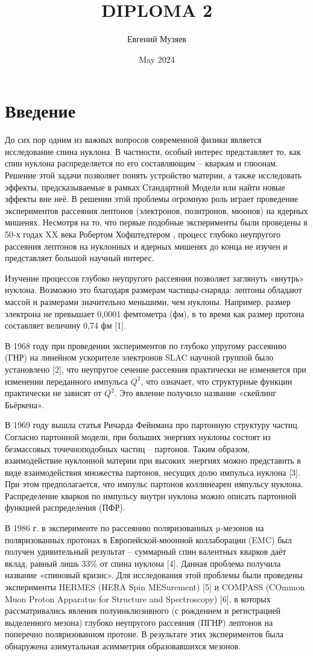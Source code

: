 \documentclass{extarticle}
\title{DIPLOMA 2}
\author{Евгений Музяев}
\date{May 2024}
\begin{document}



\newpage
\setcounter{page}{2}
\tableofcontents
\newpage
\section*{Введение}


До сих пор одним из важных вопросов современной физики является исследование спина нуклона. В частности, особый интерес представляет то, как спин нуклона распределяется по его составляющим – кваркам и глюонам. Решение этой задачи позволяет понять устройство материи, а также исследовать эффекты, предсказываемые в рамках Стандартной Модели или найти новые эффекты вне неё. В решении этой проблемы огромную роль играет проведение экспериментов рассеяния лептонов (электронов, позитронов, мюонов) на ядерных мишенях. Несмотря на то, что первые подобные эксперименты были проведены в 50-х годах XX века Робертом Хофштедтером \cite{Hofstadter}, процесс глубоко неупругого рассеяния лептонов на нуклонных и ядерных мишенях до конца не изучен и представляет большой научный интерес.


Изучение процессов глубоко неупругого рассеяния позволяет заглянуть «внутрь» нуклона. Возможно это благодаря размерам частицы-снаряда: лептоны обладают массой и размерами значительно меньшими, чем нуклоны. Например, размер электрона не превышает 0,0001 фемтометра (фм), в то время как размер протона составляет величину 0,74 фм [1].


В 1968 году при проведении экспериментов по глубоко упругому рассеянию (ГНР) на линейном ускорителе электронов SLAC научной группой было установлено [2], что неупругое сечение рассеяния практически не изменяется при изменении переданного импульса $Q^2$, что означает, что структурные функции практически не зависят от $Q^2$. Это явление получило название «скейлинг Бьёркена».


В 1969 году вышла статья Ричарда Фейнмана про партонную структуру частиц. Согласно партонной модели, при больших энергиях нуклоны состоят из безмассовых точечноподобных частиц – партонов. Таким образом, взаимодействие нуклонной материи при высоких энергиях можно представить в виде взаимодействия множества партонов, несущих долю импульса нуклона [3]. При этом предполагается, что импульс партонов коллинеарен импульсу нуклона. Распределение кварков по импульсу внутри нуклона можно описать партонной функцией распределения (ПФР).


В 1986 г. в эксперименте по рассеянию поляризованных µ-мезонов на поляризованных протонах в Европейской-мюонной коллаборации (EMC) был получен удивительный результат – суммарный спин валентных кварков даёт вклад, равный лишь 33\% от спина нуклона [4]. Данная проблема получила название «спиновый кризис». Для исследования этой проблемы были проведены эксперименты HERMES (HERA Spin MESurement) [5] и COMPASS (COmmon Muon Proton Apparatus for Structure and Spectroscopy) [6], в которых рассматривались явления полуинклюзивного (с рождением и регистрацией выделенного мезона) глубоко неупругого рассеяния (ПГНР) лептонов на поперечно поляризованном протоне. В результате этих экспериментов была обнаружена азимутальная асимметрия образовавшихся мезонов.
\end{document}
